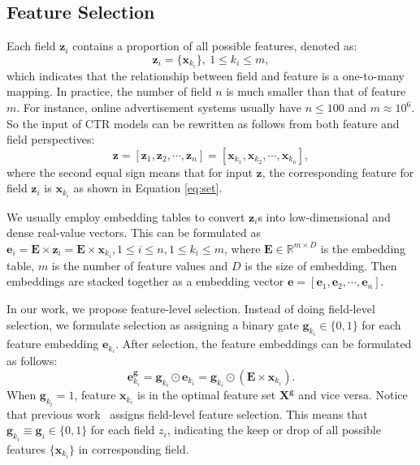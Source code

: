 \documentclass[sigconf]{acmart}
\begin{document}
\subsection{Feature Selection}
\label{sec:method_fs}
Each field $\mathbf{z}_i$ contains a proportion of all possible features, denoted as:
\begin{equation}
\label{eq:set}
    \mathbf{z}_i = \{ \mathbf{x}_{k_i} \}, \ 1 \le k_i \le m,
\end{equation}
which indicates that the relationship between field and feature is a one-to-many mapping. In practice, the number of field $n$ is much smaller than that of feature $m$. For instance, online advertisement systems usually have $n \le 100$ and $m \approx 10^6$. So the input of CTR models can be rewritten as follows from both feature and field perspectives:
\begin{equation}
\label{eq:input}
    \mathbf{z} = [\mathbf{z}_1, \mathbf{z}_2, \cdots, \mathbf{z}_n] = [\mathbf{x}_{k_1}, \mathbf{x}_{k_2}, \cdots, \mathbf{x}_{k_n}],
\end{equation}
where the second equal sign means that for input $\mathbf{z}$, the corresponding feature for field $\mathbf{z}_i$ is $\mathbf{x}_{k_i}$ as shown in Equation \ref{eq:set}. 

We usually employ embedding tables to convert $\mathbf{z}_i$s into low-dimensional and dense real-value vectors. This can be formulated as $\mathbf{e}_{i}=\mathbf{E} \times \mathbf{z}_{i}=\mathbf{E} \times \mathbf{x}_{k_i}, 1 \le i \le n, 1 \le k_i \le m$, where $\mathbf{E}\in\mathbb{R}^{m\times D}$ is the embedding table, $m$ is the number of feature values and $D$ is the size of embedding. Then embeddings are stacked together as a embedding vector $\mathbf{e} = [\mathbf{e}_{1}, \mathbf{e}_{2}, \cdots, \mathbf{e}_{n}]$.

In our work, we propose feature-level selection. Instead of doing field-level selection, we formulate selection as assigning a binary gate $\mathbf{g}_{k_i}\in\{0,1\}$ for each feature embedding $\mathbf{e}_{k_i}$. After selection, the feature embeddings can be formulated as follows: 
\begin{equation}
    \mathbf{e}_{k_i}^\mathbf{g} = \mathbf{g}_{k_i} \odot \mathbf{e}_{k_i} = \mathbf{g}_{k_i} \odot (\mathbf{E} \times \mathbf{x}_{k_i}).
\end{equation}
When $\mathbf{g}_{k_i} = 1$, feature $\mathbf{x}_{k_i}$ is in the optimal feature set $\mathbf{X}^\mathbf{g}$ and vice versa. Notice that previous work~\cite{LASSO, LPFS, AutoField} assigns field-level feature selection. This means that $ \mathbf{g}_{k_i} \equiv \mathbf{g}_{i}\in\{0,1\}$ for each field $z_i$, indicating the keep or drop of all possible features $\{ \mathbf{x}_{k_i} \}$ in corresponding field. 
\end{document}
